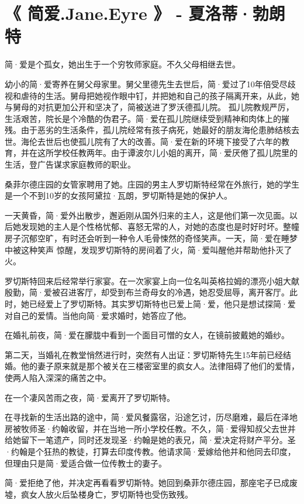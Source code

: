 \documentclass[UTF8,a4paper,8pt]{ctexbook}
\begin{document}
\newpage
\section{《 简爱.Jane.Eyre 》 - 夏洛蒂·勃朗特}
	简·爱是个孤女，她出生于一个穷牧师家庭。不久父母相继去世。
	
	幼小的简·爱寄养在舅父母家里。舅父里德先生去世后，简·爱过了10年倍受尽歧视和虐待的生活。舅母把她视作眼中钉，并把她和自己的孩子隔离开来，从此，她与舅母的对抗更加公开和坚决了，简被送进了罗沃德孤儿院。
	孤儿院教规严厉，生活艰苦，院长是个冷酷的伪君子。简·爱在孤儿院继续受到精神和肉体上的摧残。由于恶劣的生活条件，孤儿院经常有孩子病死，她最好的朋友海伦患肺结核去世。海伦去世后也使孤儿院有了大的改善。简·爱在新的环境下接受了六年的教育，并在这所学校任教两年。由于谭波尔儿小姐的离开，简·爱厌倦了孤儿院里的生活，登广告谋求家庭教师的职业。
	
	桑菲尔德庄园的女管家聘用了她。庄园的男主人罗切斯特经常在外旅行，她的学生是一个不到10岁的女孩阿黛拉·瓦朗，罗切斯特是她的保护人。
	
	一天黄昏，简·爱外出散步，邂逅刚从国外归来的主人，这是他们第一次见面。以后她发现她的主人是个性格忧郁、喜怒无常的人，对她的态度也是时好时坏。整幢房子沉郁空旷，有时还会听到一种令人毛骨悚然的奇怪笑声。一天，简·爱在睡梦中被这种笑声
	惊醒，发现罗切斯特的房间着了火，简·爱叫醒他并帮助他扑灭了火。
	
	罗切斯特回来后经常举行家宴。在一次家宴上向一位名叫英格拉姆的漂亮小姐大献殷勤，简·爱被召进客厅，却受到布兰奇母女的冷遇，她忍受屈辱，离开客厅。此时，她已经爱上了罗切斯特。其实罗切斯特也已爱上简·爱，他只是想试探简·爱对自己的爱情。当他向简·爱求婚时，她答应了他。
	
	在婚礼前夜，简·爱在朦胧中看到一个面目可憎的女人，在镜前披戴她的婚纱。

	第二天，当婚礼在教堂悄然进行时，突然有人出证：罗切斯特先生15年前已经结婚。他的妻子原来就是那个被关在三楼密室里的疯女人。法律阻碍了他们的爱情，使两人陷入深深的痛苦之中。
	
	在一个凄风苦雨之夜，简·爱离开了罗切斯特。
	
	在寻找新的生活出路的途中，简·爱风餐露宿，沿途乞讨，历尽磨难，最后在泽地房被牧师圣·约翰收留，并在当地一所小学校任教。不久，简·爱得知叔父去世并给她留下一笔遗产，同时还发现圣·约翰是她的表兄，简·爱决定将财产平分。圣·约翰是个狂热的教徒，打算去印度传教。他请求简·爱嫁给他并和他同去印度，但理由只是简·爱适合做一位传教士的妻子。
	
	简·爱拒绝了他，并决定再看看罗切斯特。她回到桑菲尔德庄园，那座宅子已成废墟，疯女人放火后坠楼身亡，罗切斯特也受伤致残。
	
\end{document}
